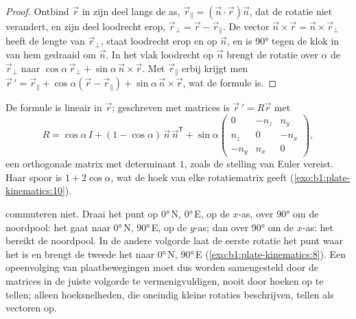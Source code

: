 \begin{proof}
Ontbind $\vec r$ in zijn deel langs de as, $\vec r_\parallel =
(\vec n\cdot\vec r)\vec n$, dat de rotatie niet verandert, en zijn deel loodrecht erop, $\vec r_\perp = \vec r - \vec r_\parallel$. De vector
$\vec n\times\vec r = \vec n\times\vec r_\perp$ heeft de lengte van $\vec r_\perp$, staat loodrecht erop en op $\vec n$, en is \ang{90} tegen de klok in van hem gedraaid om $\vec n$. In het vlak loodrecht op $\vec n$ brengt de rotatie over $\alpha$ de $\vec r_\perp$ naar $\cos\alpha\,\vec r_\perp +
\sin\alpha\,\vec n\times\vec r$. Met $\vec r_\parallel$ erbij krijgt men $\vec r\,' =
\vec r_\parallel + \cos\alpha(\vec r - \vec r_\parallel) + \sin\alpha\,
\vec n\times\vec r$, wat de formule is.
\end{proof}

De formule is lineair in $\vec r$; geschreven met matrices is $\vec r\,' = R\vec r$ met
\[
  R = \cos\alpha\,I + (1 - \cos\alpha)\,\vec n\,\vec n^{\mathsf T}
  + \sin\alpha
  \begin{pmatrix} 0 & -n_z & n_y\\ n_z & 0 & -n_x\\ -n_y & n_x & 0\end{pmatrix},
\]
een orthogonale matrix met determinant $1$, zoals de stelling van Euler vereist. Haar spoor is $1 + 2\cos\alpha$, wat de hoek van elke rotatiematrix geeft (\cref{exo:b1:plate-kinematics:10}).

 commuteren niet. Draai het punt op \ang{0}\,N, \ang{0}\,E, op de $x$-as, over \ang{90} om de noordpool: het gaat naar \ang{0}\,N, \ang{90}\,E, op de $y$-as; dan over \ang{90} om de $x$-as: het bereikt de noordpool. In de andere volgorde laat de eerste rotatie het punt waar het is en brengt de tweede het naar \ang{0}\,N, \ang{90}\,E (\cref{exo:b1:plate-kinematics:8}). Een opeenvolging van plaatbewegingen moet dus worden samengesteld door de matrices in de juiste volgorde te vermenigvuldigen, nooit door hoeken op te tellen; alleen hoeksnelheden, die oneindig kleine rotaties beschrijven, tellen als vectoren op.

